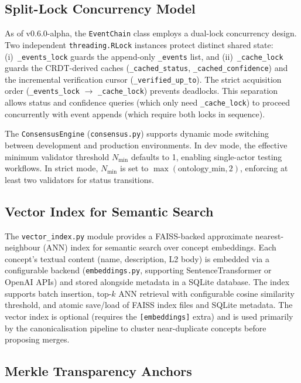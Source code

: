 \subsection{Split-Lock Concurrency Model}\label{app:split-lock}

As of v0.6.0-alpha, the \texttt{EventChain} class employs a dual-lock concurrency design. Two independent \texttt{threading.RLock} instances protect distinct shared state: (i)~\texttt{\_events\_lock} guards the append-only \texttt{\_events} list, and (ii)~\texttt{\_cache\_lock} guards the CRDT-derived caches (\texttt{\_cached\_status}, \texttt{\_cached\_confidence}) and the incremental verification cursor (\texttt{\_verified\_up\_to}). The strict acquisition order (\texttt{\_events\_lock} $\to$ \texttt{\_cache\_lock}) prevents deadlocks. This separation allows status and confidence queries (which only need \texttt{\_cache\_lock}) to proceed concurrently with event appends (which require both locks in sequence).

The \texttt{ConsensusEngine} (\texttt{consensus.py}) supports dynamic mode switching between development and production environments. In dev mode, the effective minimum validator threshold $N_{\min}$ defaults to 1, enabling single-actor testing workflows. In strict mode, $N_{\min}$ is set to $\max(\text{ontology\_min}, 2)$, enforcing at least two validators for status transitions.

\subsection{Vector Index for Semantic Search}\label{app:vector-index}

The \texttt{vector\_index.py} module provides a FAISS-backed approximate nearest-neighbour (ANN) index for semantic search over concept embeddings. Each concept's textual content (name, description, L2 body) is embedded via a configurable backend (\texttt{embeddings.py}, supporting SentenceTransformer or OpenAI APIs) and stored alongside metadata in a SQLite database. The index supports batch insertion, top-$k$ ANN retrieval with configurable cosine similarity threshold, and atomic save/load of FAISS index files and SQLite metadata. The vector index is optional (requires the \texttt{[embeddings]} extra) and is used primarily by the canonicalisation pipeline to cluster near-duplicate concepts before proposing merges.

\subsection{Merkle Transparency Anchors}\label{app:merkle}

